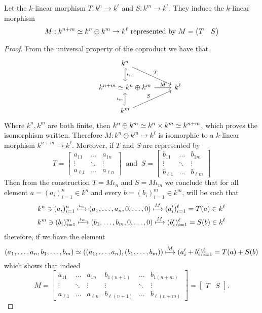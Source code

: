 \begin{proposition}
  Let the \(k\)-linear morphism \(T : k^n \to k^\ell\) and \(S : k^m \to
  k^\ell\). They induce the \(k\)-linear morphism
  \[
    M : k^{n+m} \simeq k^n \oplus k^m \to k^\ell \text{ represented by }
    M = \begin{pmatrix} T &S \end{pmatrix}
  \]
\end{proposition}

\begin{proof}
   From the universal property of the coproduct we have that
   \[
     \begin{tikzcd}
        &k^n \ar[hook, "\iota_n", d]  \ar[dr, "T"]& \\
        & k^{n+m} \iso k^n \oplus k^m \ar[r, "M"] &k^\ell \\
        &k^m \ar[hook, "\iota_m", u] \ar[ur, "S"] &
     \end{tikzcd}
   \]
   Where \(k^n, k^m\) are both finite, then \(k^n \oplus k^m \simeq k^n \times k^m
   \simeq k^{n+m}\), which proves the isomorphism written. Therefore \(M : k^n
   \oplus k^m \to k^\ell\) is isomorphic to a \(k\)-linear morphism \(k^{n+m}
   \to k^\ell\). Moreover, if \(T\) and \(S\) are represented by
   \[
    T =
    \begin{bmatrix}
      a_{11} &\dots &a_{1n} \\
      \vdots &\ddots &\vdots \\
      a_{\ell 1} &\dots & a_{\ell n}
    \end{bmatrix}
    \ \text{ and }\
    S =
    \begin{bmatrix}
      b_{11} &\dots &b_{1m} \\
      \vdots &\ddots &\vdots \\
      b_{\ell 1} &\dots & b_{\ell m}
    \end{bmatrix}
   \]
   Then from the construction \(T = M  \iota_n\) and \(S = M
   \iota_m\) we conclude that for all element \(a = (a_i)_{i=1}^n \in k^n\) and
   every \(b = (b_i)_{i=1}^m \in k^m\), will be such that
   \begin{gather*}
     k^n \ni (a_i)_{i=1}^n \xmapsto{\iota_n} (a_1, \dots, a_n, 0, \dots, 0)
     \xmapsto{M} (a'_i)_{i=1}^\ell = T(a) \in k^\ell
     \\
     k^m \ni (b_i)_{i=1}^m \xmapsto{\iota_m} (b_1, \dots, b_m, 0, \dots, 0)
     \xmapsto{M} (b'_i)_{i=1}^\ell = S(b) \in k^\ell
   \end{gather*}
   therefore, if we have the element
   \[
     (a_1, \dots, a_n, b_1, \dots, b_m) \simeq \left( (a_1, \dots, a_n), (b_1,
     \dots, b_m) \right) \xmapsto M (a'_i + b'_i)_{i=1}^\ell = T(a) + S(b)
   \]
   which shows that indeed
   \[
     M =
     \begin{bmatrix}
       a_{11} &\dots &a_{1n} &b_{1(n+1)} &\dots &b_{1(n+m)} \\
       \vdots &\ddots &\vdots &\vdots &\ddots &\vdots\\
       a_{\ell 1} &\dots & a_{\ell n} &b_{\ell (n+1)} &\dots &b_{\ell(n+m)}
     \end{bmatrix}
     =
     \begin{bmatrix}
       T &S
     \end{bmatrix}
     .
   \]
\end{proof}
